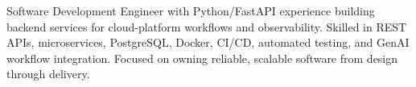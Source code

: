 \par{
Software Development Engineer with Python/FastAPI experience building backend services for cloud-platform workflows and observability. Skilled in REST APIs, microservices, PostgreSQL, Docker, CI/CD, automated testing, and GenAI workflow integration. Focused on owning reliable, scalable software from design through delivery.
}
